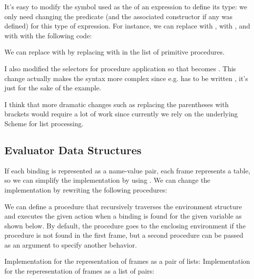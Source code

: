 \begin{exe}[4.10]
    It’s easy to modify the symbol used as the  of an expression to 
    define its type: we only need changing the predicate (and the associated 
    constructor if any was defined) for this type of expression. For instance, 
    we can replace  with ,  with \vscm{&&}, and 
     with \vscm{||} with the following code:

    We can replace  with \vscm{!} by replacing
     with  in the list of primitive 
    procedures.

    I also modified the selectors for procedure application so that
     becomes . This change actually makes 
    the syntax more complex since e.g.  has to be written 
    , it’s just for the sake of the example.

    I think that more dramatic changes such as replacing the parentheses with 
    brackets would require a lot of work since currently we rely on the 
    underlying Scheme for list processing.
\end{exe}

\subsection{Evaluator Data Structures}

\begin{exe}[4.11]
    If each binding is represented as a name-value pair, each frame represents 
    a table, so we can simplify the implementation by using . We can 
    change the implementation by rewriting the following procedures:
\end{exe}

\begin{exe}[4.12]
    \label{4.12}
    We can define a procedure that recursively traverses the environment 
    structure and executes the given action when a binding is found for the 
    given variable as shown below. By default, the procedure goes to the 
    enclosing environment if the procedure is not found in the first frame, but 
    a second procedure can be passed as an argument to specify another behavior.

    Implementation for the representation of frames as a pair of lists:
    Implementation for the reperesentation of frames as a list of pairs:
\end{exe}

